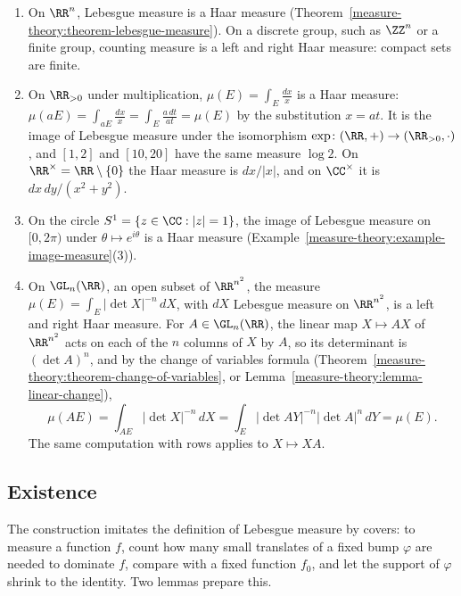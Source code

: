 \begin{example}\label{radon-measures:example-haar}
\begin{enumerate}
\item On $\RR^n$, Lebesgue measure is a Haar measure (Theorem~\ref{measure-theory:theorem-lebesgue-measure}). On a discrete group, such as $\ZZ^n$ or a finite group, counting measure is a left and right Haar
measure: compact sets are finite.
\item On $\RR_{>0}$ under multiplication, $\mu(E) = \int_E\frac{dx}{x}$ is a Haar measure: $\mu(aE) = \int_{aE}\frac{dx}{x} = \int_E\frac{a\,dt}{at} = \mu(E)$ by the substitution $x = at$. It is the image of
Lebesgue measure under the isomorphism $\exp \colon (\RR, +) \to (\RR_{>0}, \cdot)$, and $[1, 2]$ and $[10, 20]$ have the same measure $\log 2$. On $\RR^\times = \RR \setminus \{0\}$ the Haar
measure is $dx/|x|$, and on $\CC^\times$ it is $dx\,dy/(x^2 + y^2)$.
\item On the circle $S^1 = \{z \in \CC : |z| = 1\}$, the image of Lebesgue measure on $[0, 2\pi)$ under $\theta \mapsto e^{i\theta}$ is a Haar measure (Example~\ref{measure-theory:example-image-measure}(3)).
\item On $\GL_n(\RR)$, an open subset of $\RR^{n^2}$, the measure $\mu(E) = \int_E|\det X|^{-n}\,dX$, with $dX$ Lebesgue measure on $\RR^{n^2}$, is a left and right Haar measure. For
$A \in \GL_n(\RR)$, the linear map $X \mapsto AX$ of $\RR^{n^2}$ acts on each of the $n$ columns of $X$ by $A$, so its determinant is $(\det A)^n$, and by the change of variables formula
(Theorem~\ref{measure-theory:theorem-change-of-variables}, or Lemma~\ref{measure-theory:lemma-linear-change}),
\[
\mu(AE) = \int_{AE}|\det X|^{-n}\,dX = \int_E|\det AY|^{-n}|\det A|^n\,dY = \mu(E).
\]
The same computation with rows applies to $X \mapsto XA$.
\end{enumerate}
\end{example}

\subsection{Existence}\label{radon-measures:subsection-haar-existence}

The construction imitates the definition of Lebesgue measure by covers: to measure a function $f$, count how many small translates of a fixed bump $\varphi$ are needed to dominate $f$, compare with a
fixed function $f_0$, and let the support of $\varphi$ shrink to the identity. Two lemmas prepare this.

